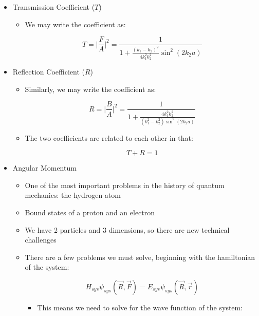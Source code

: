 \begin{itemize}
\begin{itemize}
    \end{itemize}

  \item Transmission Coefficient ($T$)

    \begin{itemize}

      \item We may write the coefficient as:

        $$T=\Big|\frac{F}{A}\Big|^2=\frac{1}{1+\frac{(k_1-k_2)^2}{4k_1^2k_2^2}\sin^2(2k_2a)}$$

    \end{itemize}

  \item Reflection Coefficient ($R$)

    \begin{itemize}

      \item Similarly, we may write the coefficient as:

        $$R=\Big|\frac{B}{A}\Big|^2=\frac{1}{1+\frac{4k_1^2k_2^2}{(k_1^2-k_2^2)\sin^2(2k_2a)}}$$

      \item The two coefficients are related to each other in that:

        $$T+R=1$$

    \end{itemize}

  \item Angular Momentum

    \begin{itemize}

      \item One of the most important problems in the history of quantum mechanics: the hydrogen atom

      \item Bound states of a proton and an electron

      \item We have 2 particles and 3 dimensions, so there are new technical challenges

      \item There are a few problems we must solve, beginning with the hamiltonian of the system:

        $$H_{sys}\psi_{sys}(\vec{R},\vec{F})=E_{sys}\psi_{sys}(\vec{R},\vec{r})$$

        \begin{itemize}

          \item This means we need to solve for the wave function of the system:


\end{itemize}
\end{itemize}
\end{itemize}

